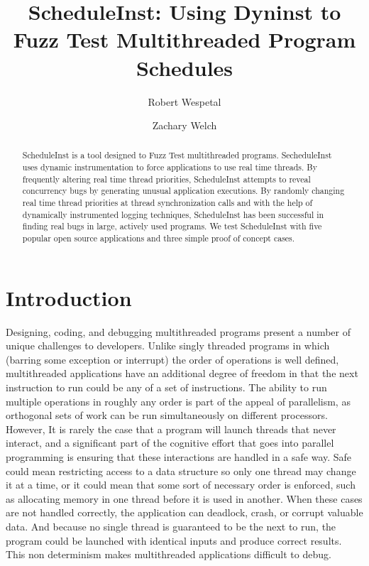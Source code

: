 \documentclass[10pt,]{article} %
\title{ScheduleInst: Using Dyninst to Fuzz Test Multithreaded Program Schedules}
\author{Robert Wespetal\\
\and
Zachary Welch}
\begin{document}
\setlength{\baselineskip}{18pt}

\maketitle

\begin{abstract}
\setlength{\baselineskip}{18pt}
ScheduleInst is a tool designed to Fuzz Test multithreaded programs.  SecheduleInst uses dynamic instrumentation to force applications to use real time threads.  By frequently altering real time thread priorities, ScheduleInst attempts to reveal concurrency bugs by generating unusual application executions. By randomly changing real time thread priorities at thread synchronization calls and with the help of dynamically instrumented logging techniques, ScheduleInst has been successful in finding real bugs in large, actively used programs. We test ScheduleInst with five popular open source applications and three simple proof of concept cases.      


 \end{abstract}


\section{Introduction}

Designing, coding, and debugging multithreaded programs present a number of unique challenges to developers. Unlike singly threaded programs in which (barring some exception or interrupt) the order of operations is well defined, multithreaded applications have an additional degree of freedom in that the next instruction to run could be any of a set of instructions.  The ability to run multiple operations in roughly any order is part of the appeal of parallelism, as orthogonal sets of work can be run simultaneously on different processors.  However, It is rarely the case that a program will launch threads that never interact, and a significant part of the cognitive effort that goes into parallel programming is ensuring that these interactions are handled in a safe way. Safe could mean restricting access to a data structure so only one thread may change it at a time, or it could mean that some sort of necessary order is enforced, such as allocating memory in one thread before it is used in another.  When these cases are not handled correctly, the application can deadlock, crash, or corrupt valuable data.  And because no single thread is guaranteed to be the next to run, the program could be launched with identical  inputs and produce correct results.  This non determinism makes multithreaded applications difficult to debug.
\end{document}
